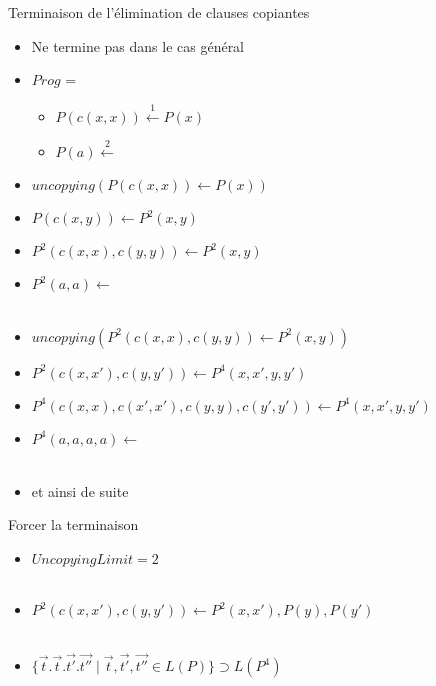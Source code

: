 \begin{frame}{Terminaison de l'élimination de clauses copiantes}
  \begin{itemize}[<+->]
  \item Ne termine pas dans le cas général
  \item $Prog$ =
    \begin{itemize}
    \item {}$P(c(x,x)) \stackrel{1}{\leftarrow} P(x)$
    \item {}$P(a) \stackrel{2}{\leftarrow} $
    \end{itemize}
    \vspace{\baselineskip}

  \item $uncopying(P(c(x,x)) \leftarrow P(x))$
  \item $P(c(x,y)) \leftarrow P^2(x, y)$
  \item {}$P^2(c(x,x),c(y,y)) \leftarrow P^2(x,y)$
  \item {}$P^2(a,a) \leftarrow $ \\~

  \item $uncopying(P^2(c(x,x), c(y,y)) \leftarrow P^2(x,y))$
  \item $P^2(c(x,x'), c(y,y')) \leftarrow P^4(x, x', y, y')$
  \item $P^4(c(x,x),c(x',x'),c(y,y),c(y',y')) \leftarrow P^4(x,x',y,y')$
  \item $P^4(a,a,a,a) \leftarrow $ \\~

  \item et ainsi de suite
  \end{itemize}
    
\end{frame}

\begin{frame}{Forcer la terminaison}
  \begin{itemize}[<+->]
  \item $UncopyingLimit = 2$ \\~

  \item $P^2(c(x,x'), c(y,y')) \leftarrow P^2(x, x'), P(y), P(y')$ \\~

  \item $\{ \vec{t}. \vec{t}. \vec{t'}. \vec{t''} \mid \vec{t},\vec{t'},\vec{t''} \in L(P) \} \supset L(P^4)$
  \end{itemize}
\end{frame}